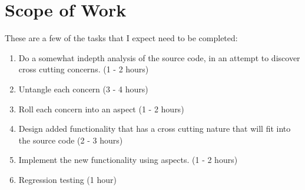 \documentclass{article}
\begin{document}
\section{Scope of Work}
These are a few of the tasks that I expect need to be completed:

\begin{enumerate}

  \item Do a somewhat indepth analysis of the source code, in an attempt to discover cross cutting concerns. (1 - 2 hours)
  \item Untangle each concern  (3 - 4 hours)
  \item Roll each concern into an aspect (1 - 2 hours)
  \item Design added functionality that has a cross cutting nature that will fit into the source code (2 - 3 hours)
  \item Implement the new functionality using aspects. (1 - 2 hours)
  \item Regression testing (1 hour)

\end{enumerate}
\end{document}
